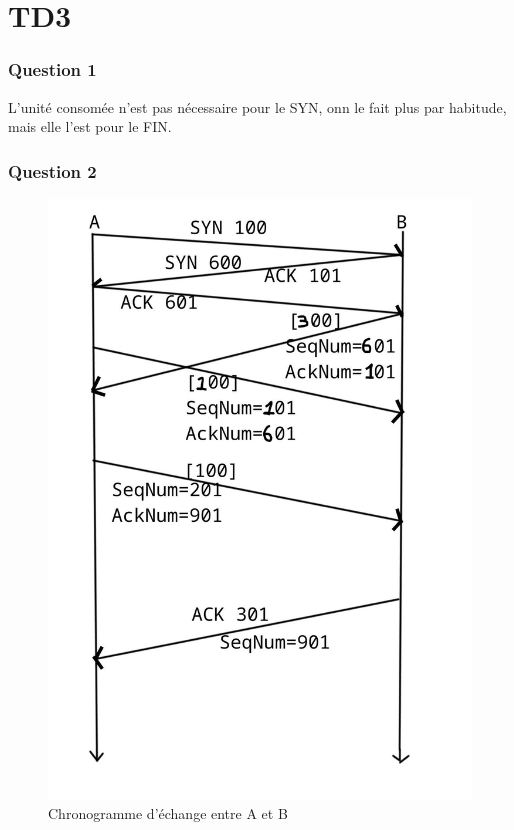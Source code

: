 \section{TD3}

\subsubsection{Question 1}

L'unité consomée n'est pas nécessaire pour le SYN, onn le fait plus par habitude, mais elle l'est pour le FIN.


\subsubsection{Question 2}

\begin{figure}[h!]
  \includegraphics[width=\linewidth,height=0.75\textheight]{TDs/schemas/chronogramme_echange.jpg}
  \caption{Chronogramme d'échange entre A et B}
  \label{fig:chronogramme1}
\end{figure}

